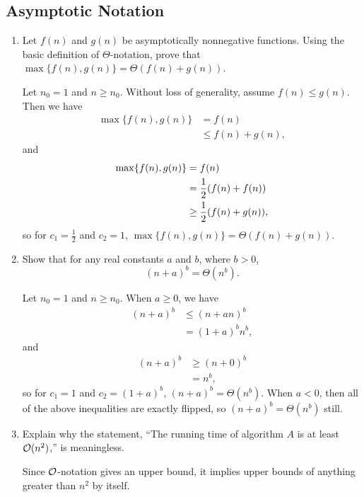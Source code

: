 \documentclass[Chapter03]{subfiles}
\begin{document}
	\subsection{Asymptotic Notation}

	\begin{enumerate}[leftmargin=\labelsep]
		\item Let $f(n)$ and $g(n)$ be asymptotically nonnegative functions. Using the basic definition of $\Theta$-notation, prove that $\max\{f(n), g(n)\} = \Theta(f(n) + g(n))$.
		\begin{answer}
			Let $n_0 = 1$ and $n \geq n_0$. Without loss of generality, assume $f(n) \leq g(n)$. Then we have
			\begin{align*}
				\max\{f(n), g(n)\} &= f(n)\\
					&\leq f(n) + g(n),
			\end{align*}
			and
			\begin{align*}
				\max\{f(n), g(n)\} &= f(n)\\
					&= \frac{1}{2}\qty(f(n) + f(n))\\
					&\geq \frac{1}{2}\qty(f(n) + g(n)),
			\end{align*}
			so for $c_1 = \frac{1}{2}$ and $c_2 = 1$, $\max\{f(n), g(n)\} = \Theta(f(n) + g(n))$.
		\end{answer}

		\item Show that for any real constants $a$ and $b$, where $b > 0$,
		\[
			(n + a)^b = \Theta(n^b).
		\]
		\begin{answer}
			Let $n_0 = 1$ and $n \geq n_0$. When $a \geq 0$, we have
			\begin{align*}
				(n + a)^b &\leq (n + an)^b\\
					&= (1 + a)^bn^b,
			\end{align*}
			and
			\begin{align*}
				(n + a)^b &\geq (n + 0)^b\\
					&= n^b,
			\end{align*}
			so for $c_1 = 1$ and $c_2 = (1 + a)^b$, $(n + a)^b = \Theta(n^b)$. When $a < 0$, then all of the above inequalities are exactly flipped, so $(n + a)^b = \Theta(n^b)$ still.
		\end{answer}

		\item Explain why the statement, ``The running time of algorithm $A$ is at least $\mathcal{O}(n^2)$,'' is meaningless.
		\begin{answer}
			Since $\mathcal{O}$-notation gives an upper bound, it implies upper bounds of anything greater than $n^2$ by itself.
		\end{answer}


\end{enumerate}
\end{document}
